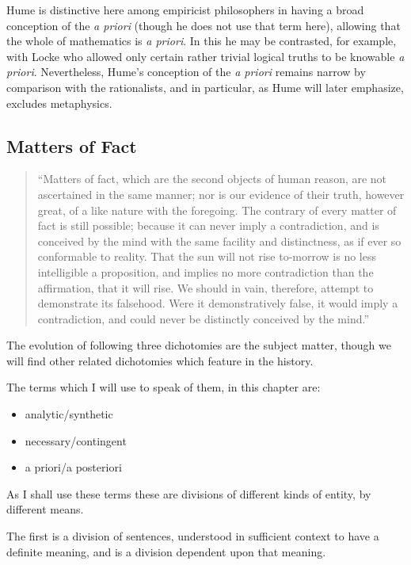Hume is distinctive here among empiricist philosophers in having a
broad conception of the {\it a priori} (though he does not use that
term here), allowing that the whole of mathematics is {\it a priori}.
In this he may be contrasted, for example, with Locke who allowed
only certain rather trivial logical truths to be knowable {\it a
  priori}.
Nevertheless, Hume's conception of the {\it a priori} remains narrow
by comparison with the rationalists, and in particular, as Hume will
later emphasize, excludes metaphysics.

\subsection{Matters of Fact}

\begin{quote}
``Matters of fact, which are the second objects of human reason, are not ascertained in the same manner; nor is our evidence of their truth, however great, of a like nature with the foregoing. The contrary of every matter of fact is still possible; because it can never imply a contradiction, and is conceived by the mind with the same facility and distinctness, as if ever so conformable to reality. That the sun will not rise to-morrow is no less intelligible a proposition, and implies no more contradiction than the affirmation, that it will rise. We should in vain, therefore, attempt to demonstrate its falsehood. Were it demonstratively false, it would imply a contradiction, and could never be distinctly conceived by the mind.''
\end{quote}

The evolution of following three dichotomies are the subject matter,
though we will find other related dichotomies which feature in the
history.

The terms which I will use to speak of them, in this chapter are:
\begin{itemize}
\item{analytic/\-synthetic}
\item{necessary/contingent}
\item{a priori/a posteriori}
\end{itemize}

As I shall use these terms these are divisions of different kinds of
entity, by different means.

The first is a division of sentences, understood in sufficient context
to have a definite meaning, and is a division dependent upon that
meaning.

